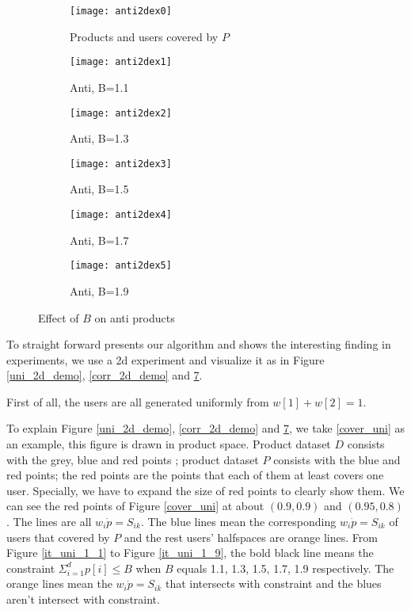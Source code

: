 \begin{figure}[ht!]
  \centering
  \begin{subfigure}[b]{0.45\linewidth}
    \texttt{[image: anti2dex0]}
    \caption{Products and users covered by $P$}
    \label{cover_anti}
  \end{subfigure}
  \begin{subfigure}[b]{0.45\linewidth}
    \texttt{[image: anti2dex1]}
    \caption{Anti, B=1.1}
    \label{it_anti_1_1}
  \end{subfigure}
  \begin{subfigure}[b]{0.45\linewidth}
    \texttt{[image: anti2dex2]}
    \caption{Anti, B=1.3}
    \label{it_anti_1_3}
  \end{subfigure}
  \begin{subfigure}[b]{0.45\linewidth}
    \texttt{[image: anti2dex3]}
    \caption{Anti, B=1.5}
    \label{it_anti_1_5}
  \end{subfigure}
  \begin{subfigure}[b]{0.45\linewidth}
    \texttt{[image: anti2dex4]}
    \caption{Anti, B=1.7}
    \label{it_anti_1_7}
  \end{subfigure}
  \begin{subfigure}[b]{0.45\linewidth}
    \texttt{[image: anti2dex5]}
    \caption{Anti, B=1.9}
    \label{it_anti_1_9}
  \end{subfigure}
  \caption{Effect of $B$ on anti products}
  \label{anti_2d_demo}
\end{figure}

To straight forward presents our algorithm and shows the interesting finding in
experiments, we use a 2d experiment and visualize it as in Figure 
\ref{uni_2d_demo}, \ref{corr_2d_demo} and \ref{anti_2d_demo}.

First of all, the users are all generated uniformly from $w[1]+w[2]=1$.

To explain Figure \ref{uni_2d_demo}, \ref{corr_2d_demo} and \ref{anti_2d_demo}, we
take \ref{cover_uni} as an example, this figure is drawn in product space. 
Product dataset $D$ consists with the grey, blue and red points
; product dataset $P$ consists with the blue and red points; the red points are the points that 
each of them at least covers one user.  Specially, 
we have to expand the size of red points to clearly show them. We can see the red points
of Figure \ref{cover_uni} at about $(0.9, 0.9)$ and $(0.95, 0.8)$.
The lines are all $w_i\dot p=S_{ik}$. The blue lines mean the corresponding $w_i\dot p=S_{ik}$ of users 
that covered by $P$ and the rest users' halfspaces are orange lines. From Figure 
\ref{it_uni_1_1} to Figure \ref{it_uni_1_9}, the bold black line means 
the constraint $\Sigma_{i=1}^d p[i]\leq B$ when $B$ equals 1.1, 1.3, 1.5, 1.7, 1.9 respectively.
The orange lines mean the $w_i\dot p=S_{ik}$ that intersects with constraint and the blues aren't
intersect with constraint. 

